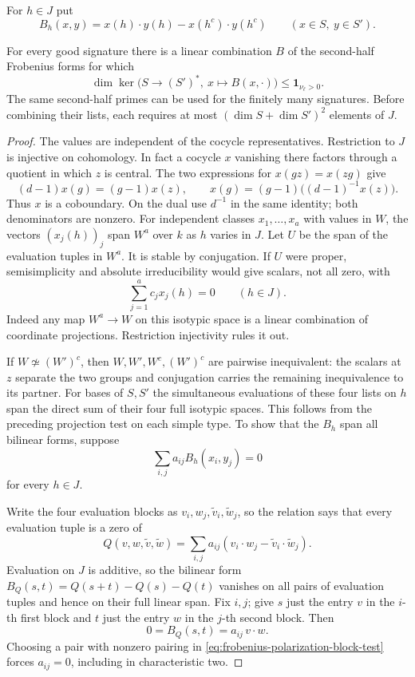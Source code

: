 For \(h\in J\) put
\[
       B_h(x,y)=x(h)\cdot y(h)-x(h^c)\cdot y(h^c)
            \qquad (x\in S,\ y\in S').
\]
\begin{lemma}
\label{lem:residual-frobenius-forms}
For every good signature there is a linear combination \(B\) of the second-half Frobenius forms for which
\[
 \dim\ker\bigl(S\longrightarrow(S')^*,\ x\longmapsto B(x,\cdot)\bigr)\le \mathbf1_{\nu_\ell>0}.
\] The same second-half primes can be
used for the finitely many signatures. Before combining their
lists, each requires at most \((\dim S+\dim S')^2\) elements of \(J\).
\end{lemma}
\begin{proof}
The values are independent of the cocycle representatives.
Restriction to \(J\) is injective on cohomology. In fact a
cocycle \(x\) vanishing there factors through a quotient in
which \(z\) is central. The two expressions for \(x(gz)=x(zg)\)
give
\[
 (d-1)x(g)=(g-1)x(z),\qquad
 x(g)=(g-1)\bigl((d-1)^{-1}x(z)\bigr).
\]
Thus \(x\) is a coboundary. On the dual use \(d^{-1}\) in the
same identity; both denominators are nonzero. For independent classes
\(x_1,\ldots,x_a\) with values in \(W\), the vectors
\((x_j(h))_j\) span \(W^a\) over \(k\) as \(h\) varies in
\(J\). Let \(U\) be the span of the evaluation tuples in \(W^a\). It is stable by conjugation. If \(U\) were proper, semisimplicity and absolute irreducibility would give scalars, not all zero, with
\[
 \sum_{j=1}^a c_j x_j(h)=0\qquad(h\in J).
\]
Indeed any map \(W^a\to W\) on this isotypic space is a linear combination of coordinate projections. Restriction injectivity rules it out.

If \(W\not\simeq (W')^c\), then
\(W,W',W^c,(W')^c\) are pairwise inequivalent: the scalars
at \(z\) separate the two groups and conjugation carries the
remaining inequivalence to its partner. For bases of \(S,S'\)
the simultaneous evaluations of these four lists on \(h\)
span the direct sum of their four full isotypic spaces. This
follows from the preceding projection test on each simple
type. To show that the \(B_h\) span all bilinear forms, suppose
\[
 \sum_{i,j}a_{ij}B_h(x_i,y_j)=0
\]
for every \(h\in J\).

Write the four evaluation blocks as \(v_i,w_j,\tilde v_i,\tilde w_j\),
so the relation says that every evaluation tuple is a zero of
\[
 Q(v,w,\tilde v,\tilde w)=\sum_{i,j}a_{ij}
      (v_i\cdot w_j-\tilde v_i\cdot\tilde w_j).
\]
Evaluation on \(J\) is additive, so the bilinear form
\(B_Q(s,t)=Q(s+t)-Q(s)-Q(t)\) vanishes on all pairs of evaluation
tuples and hence on their full linear span. Fix \(i,j\); give
\(s\) just the entry \(v\) in the \(i\)-th first block and
\(t\) just the entry \(w\) in the \(j\)-th second block. Then
\begin{equation}\label{eq:frobenius-polarization-block-test}
 0=B_Q(s,t)=a_{ij}\,v\cdot w .
\end{equation}
Choosing a pair with nonzero pairing in \eqref{eq:frobenius-polarization-block-test} forces \(a_{ij}=0\), including
in characteristic two.


\end{proof}
